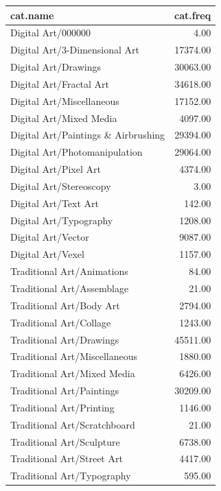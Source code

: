 \documentclass[letterpaper]{article}
\begin{document}
\begin{table}[ht]
\centering
\begin{tabular}{lr}
cat.name & cat.freq \\ 
  \hline
Digital Art/000000 & 4.00\\ 
Digital Art/3-Dimensional Art & 17374.00 \\ 
Digital Art/Drawings & 30063.00 \\ 
Digital Art/Fractal Art & 34618.00 \\ 
Digital Art/Miscellaneous & 17152.00 \\ 
Digital Art/Mixed Media & 4097.00 \\ 
Digital Art/Paintings \& Airbrushing & 29394.00 \\ 
Digital Art/Photomanipulation & 29064.00 \\ 
Digital Art/Pixel Art & 4374.00 \\ 
Digital Art/Stereoscopy & 3.00 \\ 
Digital Art/Text Art & 142.00 \\ 
Digital Art/Typography & 1208.00 \\ 
Digital Art/Vector & 9087.00 \\ 
Digital Art/Vexel & 1157.00 \\ 
Traditional Art/Animations & 84.00  \\ 
Traditional Art/Assemblage & 21.00  \\ 
Traditional Art/Body Art & 2794.00  \\ 
Traditional Art/Collage & 1243.00  \\ 
Traditional Art/Drawings & 45511.00  \\ 
Traditional Art/Miscellaneous & 1880.00  \\ 
Traditional Art/Mixed Media & 6426.00  \\ 
Traditional Art/Paintings & 30209.00  \\ 
Traditional Art/Printing & 1146.00  \\ 
Traditional Art/Scratchboard & 21.00  \\ 
Traditional Art/Sculpture & 6738.00  \\ 
Traditional Art/Street Art & 4417.00  \\ 
Traditional Art/Typography & 595.00  \\ 
   \hline
\end{tabular}
\end{table}
\end{document}
